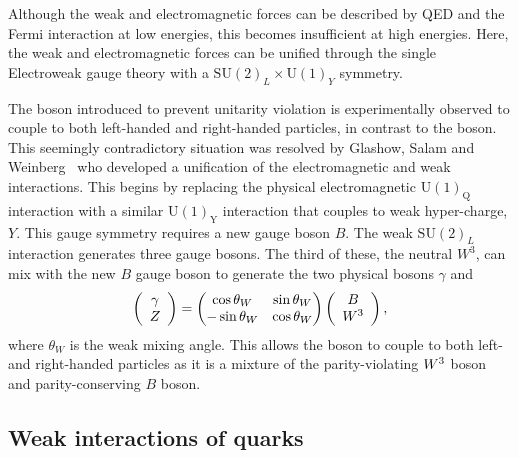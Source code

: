 Although the weak and electromagnetic forces can be described by QED and the Fermi interaction at low energies, this becomes insufficient at high energies. Here, the weak and electromagnetic forces can be unified through the single Electroweak gauge theory with a $\text{SU}(2)_{L}\times\text{U}(1)_{Y}$ symmetry.

The \Z boson introduced to prevent unitarity violation is experimentally observed to couple to both left-handed and right-handed particles, in contrast to the \Wpm boson. This seemingly contradictory situation was resolved by Glashow, Salam and Weinberg~\cite{Glashow:1959wxa,Salam:1968rm,Weinberg:1967tq} who developed a unification of the electromagnetic and weak interactions. 
This begins by replacing the physical electromagnetic $\text{U}(1)_{\text{Q}}$ interaction with a similar $\text{U}(1)_{\text{Y}}$ interaction that couples to weak hyper-charge, $Y$. This gauge symmetry requires a new gauge boson $B$. The weak $\text{SU}(2)_{L}$ interaction generates three gauge bosons. The third of these, the neutral $W^{3}$, can mix with the new $B$ gauge boson to generate the two physical bosons $\gamma$ and \Z
\begin{equation}
\left( \begin{array}{c} \gamma \\ {Z} \end{array} \right) = \begin{pmatrix} \cos{\theta_{W}} & \sin{\theta_{W}} \\ -\sin{\theta_{W}} & \cos{\theta_{W}} \end{pmatrix} \left( \begin{array}{c} B \\ W^{3} \end{array} \right),
\end{equation}
where $\theta_{W}$ is the weak mixing angle. 
This allows the \Z boson to couple to both left- and right-handed particles as it is a mixture of the parity-violating ${W}^{3}$ boson and parity-conserving $B$ boson.  


\subsection{Weak interactions of quarks}



